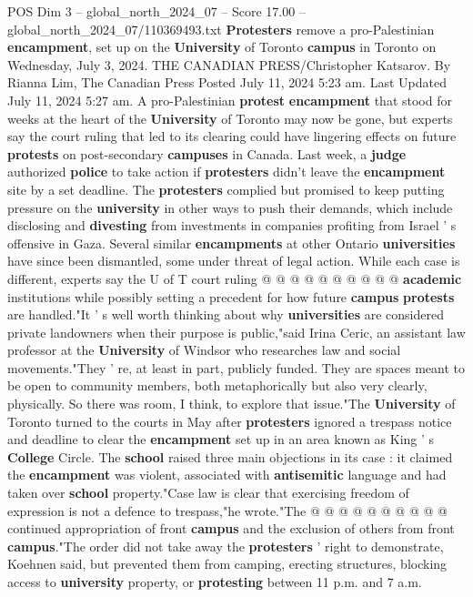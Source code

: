 \begin{textsample}{POS Dim 3 – global\_north\_2024\_07 – Score 17.00 – global\_north\_2024\_07/110369493.txt}  \label{ex:f3_pos_087}
\textbf{Protesters} remove a pro-Palestinian \textbf{encampment}, set up on the \textbf{University} of Toronto \textbf{campus} in Toronto on Wednesday, July 3, 2024.
THE CANADIAN PRESS/Christopher Katsarov.
By Rianna Lim, The Canadian Press Posted July 11, 2024 5:23 am.
Last Updated July 11, 2024 5:27 am.
A pro-Palestinian \textbf{protest} \textbf{encampment} that stood for weeks at the heart of the \textbf{University} of Toronto may now be gone, but experts say the court ruling that led to its clearing could have lingering effects on future \textbf{protests} on post-secondary \textbf{campuses} in Canada.
Last week, a \textbf{judge} authorized \textbf{police} to take action if \textbf{protesters} didn't leave the \textbf{encampment} site by a set deadline.
The \textbf{protesters} complied but promised to keep putting pressure on the \textbf{university} in other ways to push their demands, which include disclosing and \textbf{divesting} from investments in companies profiting from Israel ' s offensive in Gaza.
Several similar \textbf{encampments} at other Ontario \textbf{universities} have since been dismantled, some under threat of legal action.
While each case is different, experts say the U of T court ruling @ @ @ @ @ @ @ @ @ @ \textbf{academic} institutions while possibly setting a precedent for how future \textbf{campus} \textbf{protests} are handled."It ' s well worth thinking about why \textbf{universities} are considered private landowners when their purpose is public,"said Irina Ceric, an assistant law professor at the \textbf{University} of Windsor who researches law and social movements."They ' re, at least in part, publicly funded.
They are spaces meant to be open to community members, both metaphorically but also very clearly, physically.
So there was room, I think, to explore that issue."The \textbf{University} of Toronto turned to the courts in May after \textbf{protesters} ignored a trespass notice and deadline to clear the \textbf{encampment} set up in an area known as King ' s \textbf{College} Circle.
The \textbf{school} raised three main objections in its case : it claimed the \textbf{encampment} was violent, associated with \textbf{antisemitic} language and had taken over \textbf{school} property."Case law is clear that exercising freedom of expression is not a defence to trespass,"he wrote."The @ @ @ @ @ @ @ @ @ @ continued appropriation of front \textbf{campus} and the exclusion of others from front \textbf{campus}."The order did not take away the \textbf{protesters} ' right to demonstrate, Koehnen said, but prevented them from camping, erecting structures, blocking access to \textbf{university} property, or \textbf{protesting} between 11 p.m. and 7 a.m.

\end{textsample}
